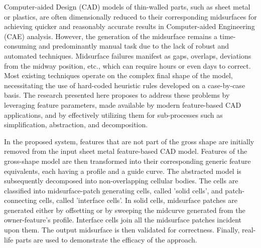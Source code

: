 Computer-aided Design (CAD) models of thin-walled parts, such as sheet metal or plastics, are often dimensionally reduced to their corresponding midsurfaces for achieving quicker and reasonably accurate results in Computer-aided Engineering (CAE) analysis. However, the generation of the midsurface remains a time-consuming and predominantly manual task due to the lack of robust and automated techniques. Midsurface failures manifest as gaps, overlaps, deviations from the midway position, etc., which can require hours or even days to correct. Most existing techniques operate on the complex final shape of the model, necessitating the use of hard-coded heuristic rules developed on a case-by-case basis. The research presented here proposes to address these problems by leveraging feature parameters, made available by modern feature-based CAD applications, and by effectively utilizing them for sub-processes such as simplification, abstraction, and decomposition.

In the proposed system, features that are not part of the gross shape are initially removed from the input sheet metal feature-based CAD model. Features of the gross-shape model are then transformed into their corresponding generic feature equivalents, each having a profile and a guide curve. The abstracted model is subsequently decomposed into non-overlapping cellular bodies. The cells are classified into midsurface-patch generating cells, called 'solid cells', and patch-connecting cells, called 'interface cells'. In solid cells, midsurface patches are generated either by offsetting or by sweeping the midcurve generated from the owner-feature's profile. Interface cells join all the midsurface patches incident upon them. The output midsurface is then validated for correctness. Finally, real-life parts are used to demonstrate the efficacy of the approach.